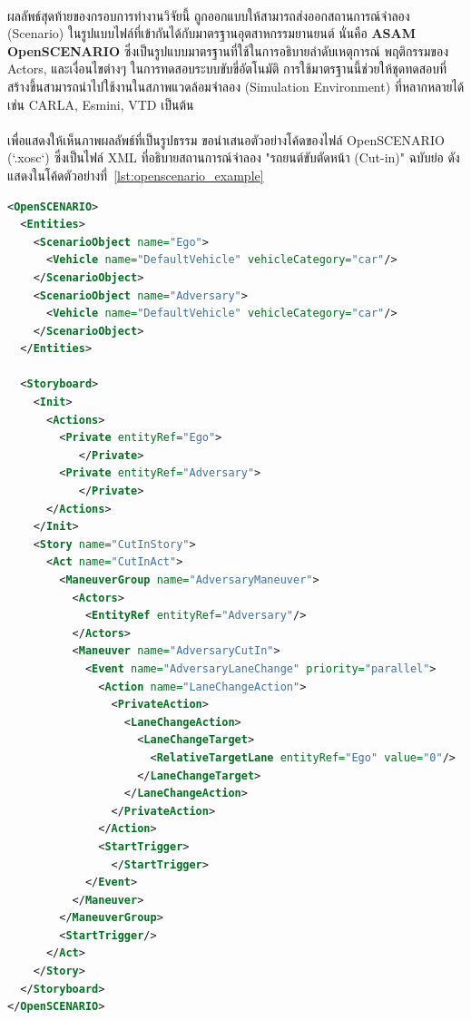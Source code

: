 \paragraph{}
ผลลัพธ์สุดท้ายของกรอบการทำงานวิจัยนี้ ถูกออกแบบให้สามารถส่งออกสถานการณ์จำลอง (Scenario) ในรูปแบบไฟล์ที่เข้ากันได้กับมาตรฐานอุตสาหกรรมยานยนต์ นั่นคือ \textbf{ASAM OpenSCENARIO} ซึ่งเป็นรูปแบบมาตรฐานที่ใช้ในการอธิบายลำดับเหตุการณ์ พฤติกรรมของ Actors, และเงื่อนไขต่างๆ ในการทดสอบระบบขับขี่อัตโนมัติ การใช้มาตรฐานนี้ช่วยให้ชุดทดสอบที่สร้างขึ้นสามารถนำไปใช้งานในสภาพแวดล้อมจำลอง (Simulation Environment) ที่หลากหลายได้ เช่น CARLA, Esmini, VTD เป็นต้น

\paragraph{}
เพื่อแสดงให้เห็นภาพผลลัพธ์ที่เป็นรูปธรรม ขอนำเสนอตัวอย่างโค้ดของไฟล์ OpenSCENARIO (`.xosc`) ซึ่งเป็นไฟล์ XML ที่อธิบายสถานการณ์จำลอง "รถยนต์ขับตัดหน้า (Cut-in)" ฉบับย่อ ดังแสดงในโค้ดตัวอย่างที่~\ref{lst:openscenario_example}

\newpage %

\begin{lstlisting}[language=XML, caption={ตัวอย่างโค้ดไฟล์ ASAM OpenSCENARIO ฉบับย่อ ที่อธิบายสถานการณ์ Cut-in}, label={lst:openscenario_example}]
<OpenSCENARIO>
  <Entities>
    <ScenarioObject name="Ego">
      <Vehicle name="DefaultVehicle" vehicleCategory="car"/>
    </ScenarioObject>
    <ScenarioObject name="Adversary">
      <Vehicle name="DefaultVehicle" vehicleCategory="car"/>
    </ScenarioObject>
  </Entities>

  <Storyboard>
    <Init>
      <Actions>
        <Private entityRef="Ego">
           </Private>
        <Private entityRef="Adversary">
           </Private>
      </Actions>
    </Init>
    <Story name="CutInStory">
      <Act name="CutInAct">
        <ManeuverGroup name="AdversaryManeuver">
          <Actors>
            <EntityRef entityRef="Adversary"/>
          </Actors>
          <Maneuver name="AdversaryCutIn">
            <Event name="AdversaryLaneChange" priority="parallel">
              <Action name="LaneChangeAction">
                <PrivateAction>
                  <LaneChangeAction>
                    <LaneChangeTarget>
                      <RelativeTargetLane entityRef="Ego" value="0"/>
                    </LaneChangeTarget>
                  </LaneChangeAction>
                </PrivateAction>
              </Action>
              <StartTrigger>
                </StartTrigger>
            </Event>
          </Maneuver>
        </ManeuverGroup>
        <StartTrigger/>
      </Act>
    </Story>
  </Storyboard>
</OpenSCENARIO>
\end{lstlisting}

